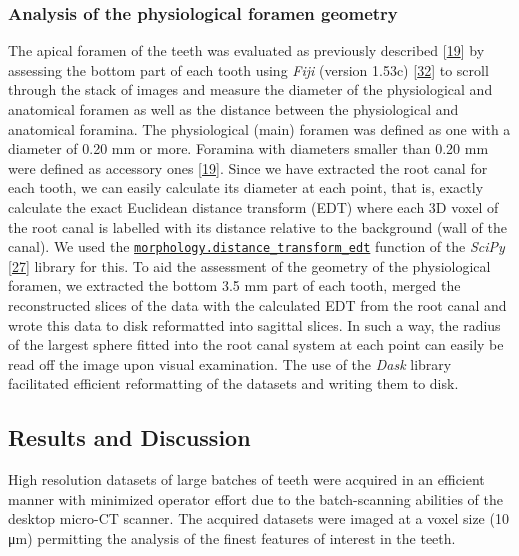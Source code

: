 \documentclass[
  american,
]{article}
\begin{document}
\hypertarget{analysis-of-the-physiological-foramen-geometry}{%
\subsubsection{Analysis of the physiological foramen geometry}\label{analysis-of-the-physiological-foramen-geometry}}

The apical foramen of the teeth was evaluated as previously described {[}\protect\hyperlink{ref-1Gn1pVZXt}{19}{]} by assessing the bottom part of each tooth using \emph{Fiji} (version 1.53c) {[}\protect\hyperlink{ref-Fkmz2cmo}{32}{]} to scroll through the stack of images and measure the diameter of the physiological and anatomical foramen as well as the distance between the physiological and anatomical foramina.
The physiological (main) foramen was defined as one with a diameter of 0.20 mm or more.
Foramina with diameters smaller than 0.20 mm were defined as accessory ones {[}\protect\hyperlink{ref-1Gn1pVZXt}{19}{]}.
Since we have extracted the root canal for each tooth, we can easily calculate its diameter at each point, that is, exactly calculate the exact Euclidean distance transform (EDT) where each 3D voxel of the root canal is labelled with its distance relative to the background (wall of the canal).
We used the \href{https://docs.scipy.org/doc/scipy-0.14.0/reference/generated/scipy.ndimage.morphology.distance_transform_edt.html}{\texttt{morphology.distance\_transform\_edt}} function of the \emph{SciPy} {[}\protect\hyperlink{ref-8Miti2Gz}{27}{]} library for this.
To aid the assessment of the geometry of the physiological foramen, we extracted the bottom 3.5 mm part of each tooth, merged the reconstructed slices of the data with the calculated EDT from the root canal and wrote this data to disk reformatted into sagittal
slices.
In such a way, the radius of the largest sphere fitted into the root canal system at each point can easily be read off the image upon visual examination.
The use of the \emph{Dask} library facilitated efficient reformatting of the datasets and writing them to disk.

\hypertarget{results-and-discussion}{%
\subsection{Results and Discussion}\label{results-and-discussion}}

High resolution datasets of large batches of teeth were acquired in an efficient manner with minimized operator effort due to the batch-scanning abilities of the desktop micro-CT scanner.
The acquired datasets were imaged at a voxel size (10 μm) permitting the analysis of the finest features of interest in the teeth.
\end{document}
